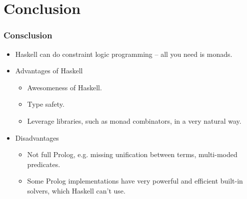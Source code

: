 \documentclass[aspectratio=169,hyphens]{beamer} %
\begin{document}
\section{Conclusion}
\begin{frame}
    \frametitle{Consclusion}
    \begin{itemize}
        \item Haskell can do constraint logic programming -- all you need is monads.
            \pause
        \item Advantages of Haskell
            \begin{itemize}
                    \pause
                \item Awesomeness of Haskell.
                    \pause
                \item Type safety.
                    \pause
                \item Leverage libraries, such as monad combinators, in a very natural way.
                    \pause
            \end{itemize}
        \item Disadvantages
            \begin{itemize}
                    \pause
                \item Not full Prolog, e.g. missing unification between terms, multi-moded predicates.
                    \pause
                \item Some Prolog implementations have very powerful and efficient built-in solvers, which Haskell can't use.
            \end{itemize}
    \end{itemize}
\end{frame}
\end{document}
